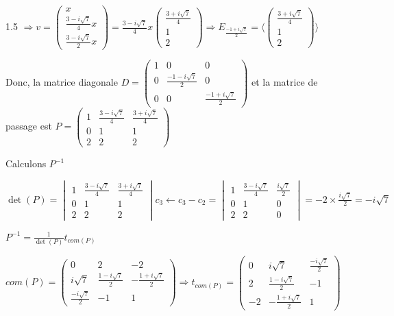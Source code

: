 \documentclass[12pt]{article}
\begin{document}
\begin{spacing}{1.5}
$\Rightarrow v=\begin{pmatrix}
x\\
\frac{3-i\sqrt{7}}{4}x\\
\frac{3-i\sqrt{7}}{2}x
\end{pmatrix}= \frac{3-i\sqrt{7}}{4}x\begin{pmatrix}
 \frac{3+i\sqrt{7}}{4}\\
1\\
2
\end{pmatrix}\Rightarrow E_{\frac{-1+i\sqrt{7}}{2}}=\langle\begin{pmatrix}
\frac{3+i\sqrt{7}}{4}\\
1\\
2
\end{pmatrix}\rangle$

Donc, la matrice diagonale $D=\begin{pmatrix}
1 & 0 & 0 \\ 
0 & \frac{-1-i\sqrt{7}}{2} & 0 \\ 
0 & 0 & \frac{-1+i\sqrt{7}}{2}
\end{pmatrix} $ et la matrice de passage est $P=\begin{pmatrix}
1 & \frac{3-i\sqrt{7}}{4} & \frac{3+i\sqrt{7}}{4} \\ 
0 & 1                   & 1 \\
2 & 2                     & 2 
\end{pmatrix}$

Calculons $P^{-1}$

$
\det(P) =\begin{vmatrix}
1 & \frac{3-i\sqrt{7}}{4} & \frac{3+i\sqrt{7}}{4} \\ 
0 & 1                   & 1 \\
2 & 2                     & 2 
\end{vmatrix}c_3\longleftarrow c_3-c_2=\begin{vmatrix}
1 & \frac{3-i\sqrt{7}}{4} & \frac{i\sqrt{7}}{2} \\ 
0 & 1                   & 0 \\
2 & 2                     & 0 
\end{vmatrix}=-2\times\frac{i\sqrt{7}}{2}=-i\sqrt{7}
$

$P^{-1}=\frac{1}{\det(P)}t_{com(P)}$

$com(P)=\begin{pmatrix}
0 & 2 & -2 \\ 
i\sqrt{7} & \frac{1-i\sqrt{7}}{2} & -\frac{1+i\sqrt{7}}{2} \\ 
\frac{-i\sqrt{7}}{2} & -1 & 1
\end{pmatrix} \Rightarrow t_{com(P)}=\begin{pmatrix}
0 & i\sqrt{7} & \frac{-i\sqrt{7}}{2} \\ 
2 & \frac{1-i\sqrt{7}}{2} & -1 \\ 
-2 & -\frac{1+i\sqrt{7}}{2} & 1
\end{pmatrix}$


\end{spacing}
\end{document}
